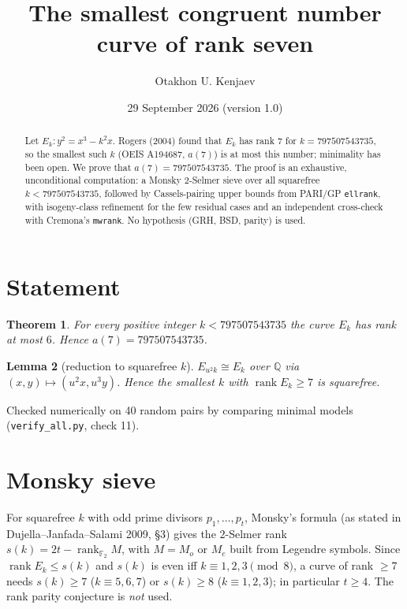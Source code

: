 \documentclass[11pt]{amsart}
\title{The smallest congruent number curve of rank seven}
\author{Otakhon U. Kenjaev}
\date{29 September 2026 (version 1.0)}
\newtheorem{theorem}{Theorem}
\newtheorem{lemma}[theorem]{Lemma}
\theoremstyle{remark}\newtheorem{remark}[theorem]{Remark}
\begin{document}
\begin{abstract}
Let $E_k\colon y^2=x^3-k^2x$. Rogers (2004) found that $E_k$ has rank $7$ for $k=797507543735$, so the smallest such $k$
(OEIS A194687, $a(7)$) is at most this number; minimality has been open. We prove that $a(7)=797507543735$.
The proof is an exhaustive, unconditional computation: a Monsky $2$-Selmer sieve over all squarefree $k<797507543735$,
followed by Cassels-pairing upper bounds from PARI/GP \texttt{ellrank}, with isogeny-class refinement for the few residual
cases and an independent cross-check with Cremona's \texttt{mwrank}. No hypothesis (GRH, BSD, parity) is used.
\end{abstract}
\maketitle

\section{Statement}
\begin{theorem}
For every positive integer $k<797507543735$ the curve $E_k$ has rank at most $6$. Hence $a(7)=797507543735$.
\end{theorem}

\begin{lemma}[reduction to squarefree $k$]
$E_{u^2k}\cong E_k$ over $\mathbb{Q}$ via $(x,y)\mapsto(u^2x,u^3y)$. Hence the smallest $k$ with $\operatorname{rank}E_k\ge 7$ is squarefree.
\end{lemma}
Checked numerically on 40 random pairs by comparing minimal models (\texttt{verify\_all.py}, check 11).

\section{Monsky sieve}
For squarefree $k$ with odd prime divisors $p_1,\dots,p_t$, Monsky's formula (as stated in Dujella--Janfada--Salami 2009, \S3)
gives the $2$-Selmer rank $s(k)=2t-\operatorname{rank}_{\mathbb F_2}M$, with $M=M_o$ or $M_e$ built from Legendre symbols.
Since $\operatorname{rank}E_k\le s(k)$ and $s(k)$ is even iff $k\equiv 1,2,3\pmod 8$, a curve of rank $\ge7$ needs
$s(k)\ge7$ ($k\equiv5,6,7$) or $s(k)\ge8$ ($k\equiv1,2,3$); in particular $t\ge4$.
The rank parity conjecture is \emph{not} used.
\end{document}
